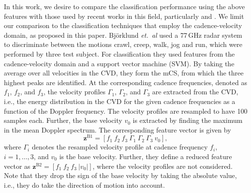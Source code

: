 In this work, we desire to compare the classification performance using the above features with those used by recent works in this field, particularly \cite{Bjoe15} and \cite{Ric15}. We limit our comparison to the classification techniques that employ the cadence-velocity domain, as proposed in this paper.
Bj{\"o}rklund \textit{et.~al} \cite{Bjoe15} used a 77\,GHz radar system to discriminate between the motions crawl, creep, walk, jog and run, which were performed by three test subject. For classification they used features from the cadence-velocity domain and a support vector machine (SVM). By taking the average over all velocities in the CVD, they form the mCS, from which the three highest peaks are identified. At the corresponding cadence frequencies, denoted as $f_1$, $f_2$, and $f_3$, the velocity profiles $\Gamma_1$, $\Gamma_2$, and $\Gamma_3$ are extracted from the CVD, i.e., the energy distribution in the CVD for the given cadence frequencies as a function of the Doppler frequency. The velocity profiles are resampled to have 100 samples each.
Further, the base velocity $v_0$ is extracted by finding the maximum in the mean Doppler spectrum. The corresponding feature vector is given by
\begin{equation}\label{eq:Bjoefull}
\mathbf{z}^\text{B1}  = [f_1~f_2~f_3~\Gamma_1~\Gamma_2~\Gamma_3~v_0],
\end{equation}
where $\Gamma_i$ denotes the resampled velocity profile at cadence frequency $f_i$, $i=1,\dots,3$, and $v_0$ is the base velocity.
Further, they define a reduced feature vector as $\mathbf{z}^\text{B2} = [f_1~f_2~f_3~|v_0|]$, where the velocity profiles are not considered. Note that they drop the sign of the base velocity by taking the absolute value, i.e., they do take the direction of motion into account.

